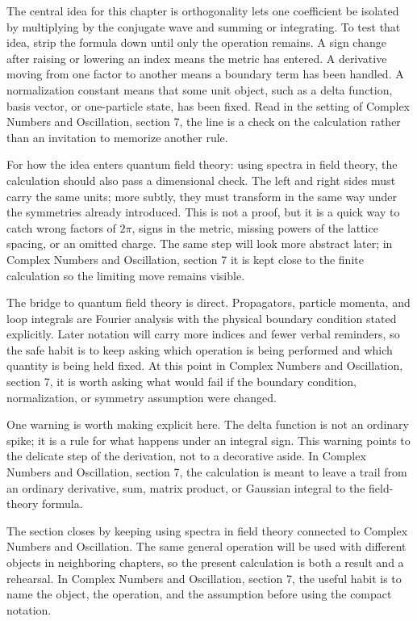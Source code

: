 The central idea for this chapter is orthogonality lets one coefficient be isolated by multiplying by the conjugate wave and summing or integrating.  To test that idea, strip the formula down until only the operation remains.  A sign change after raising or lowering an index means the metric has entered.  A derivative moving from one factor to another means a boundary term has been handled.  A normalization constant means that some unit object, such as a delta function, basis vector, or one-particle state, has been fixed.  Read in the setting of Complex Numbers and Oscillation, section 7, the line is a check on the calculation rather than an invitation to memorize another rule.

For how the idea enters quantum field theory: using spectra in field theory, the calculation should also pass a dimensional check.  The left and right sides must carry the same units; more subtly, they must transform in the same way under the symmetries already introduced.  This is not a proof, but it is a quick way to catch wrong factors of \(2\pi\), signs in the metric, missing powers of the lattice spacing, or an omitted charge.  The same step will look more abstract later; in Complex Numbers and Oscillation, section 7 it is kept close to the finite calculation so the limiting move remains visible.

The bridge to quantum field theory is direct.  Propagators, particle momenta, and loop integrals are Fourier analysis with the physical boundary condition stated explicitly.  Later notation will carry more indices and fewer verbal reminders, so the safe habit is to keep asking which operation is being performed and which quantity is being held fixed.  At this point in Complex Numbers and Oscillation, section 7, it is worth asking what would fail if the boundary condition, normalization, or symmetry assumption were changed.

One warning is worth making explicit here.  The delta function is not an ordinary spike; it is a rule for what happens under an integral sign.  This warning points to the delicate step of the derivation, not to a decorative aside.  In Complex Numbers and Oscillation, section 7, the calculation is meant to leave a trail from an ordinary derivative, sum, matrix product, or Gaussian integral to the field-theory formula.

The section closes by keeping using spectra in field theory connected to Complex Numbers and Oscillation.  The same general operation will be used with different objects in neighboring chapters, so the present calculation is both a result and a rehearsal.  In Complex Numbers and Oscillation, section 7, the useful habit is to name the object, the operation, and the assumption before using the compact notation.



